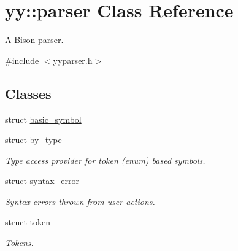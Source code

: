 \hypertarget{classyy_1_1parser}{}\section{yy\+:\+:parser Class Reference}
\label{classyy_1_1parser}


A Bison parser.  




{\ttfamily \#include $<$yyparser.\+h$>$}

\subsection*{Classes}
\begin{DoxyCompactItemize}
\item 
struct \hyperlink{structyy_1_1parser_1_1basic__symbol}{basic\+\_\+symbol}
\item 
struct \hyperlink{structyy_1_1parser_1_1by__type}{by\+\_\+type}
\begin{DoxyCompactList}\small\item\em Type access provider for token (enum) based symbols. \end{DoxyCompactList}\item 
struct \hyperlink{structyy_1_1parser_1_1syntax__error}{syntax\+\_\+error}
\begin{DoxyCompactList}\small\item\em Syntax errors thrown from user actions. \end{DoxyCompactList}\item 
struct \hyperlink{structyy_1_1parser_1_1token}{token}
\begin{DoxyCompactList}\small\item\em Tokens. \end{DoxyCompactList}\end{DoxyCompactItemize}
